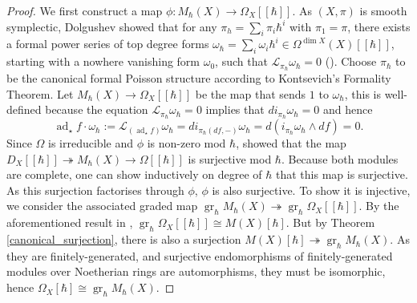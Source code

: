 \documentclass[draft]{article}
\theoremstyle{definition}
\DeclareMathOperator{\ad}{ad}
\DeclareMathOperator{\gr}{gr}
\newcommand{\doubleh}{[\![ \hbar ]\!]}
\newcommand{\MhX}{M_\hbar(X)}
\begin{document}
\begin{proof}
We first construct a map  $\phi:\MhX\to\Omega_X\doubleh$. As $(X,\pi)$ is smooth symplectic,  Dolgushev showed that for any $\pi_h=\sum_i \pi_i \hbar^i$ with $\pi_1=\pi$, there exists a
formal power series of top degree forms $\omega_\hbar= \sum_i \omega_i\hbar^i \in \Omega^{\dim X}(X)\doubleh$, starting with a nowhere vanishing form $\omega_0$, such that $\mathcal{L}_{\pi_\hbar}\omega_\hbar = 0$ (\cite[Section 3, Proposition 3.1]{The_Van_den_Bergh_duality_and_the_modular_symmetry_of_a_Poisson_variety}). Choose $\pi_\hbar$ to be the canonical formal Poisson structure according to Kontsevich's Formality Theorem. Let $\MhX\to\Omega_X\doubleh$ be the map that sends $1$ to $\omega_\hbar$, this is well-defined because the equation $\mathcal{L}_{\pi_\hbar}\omega_\hbar = 0$ implies that $di_{\pi_\hbar}\omega_\hbar=0$ and hence $$\ad_\star f\cdot \omega_\hbar:=\mathcal{L}_{(\ad_\star f)}\omega_\hbar=di_{\pi_\hbar(df,-)}\omega_\hbar=d(i_{\pi_\hbar}\omega_\hbar\wedge df)=0.$$ Since $\Omega$ is irreducible and $\phi$ is non-zero mod $\hbar$, \cite{Poisson_Traces_and_D-Modules_on_Poisson_Varieties} showed that the map $D_X\doubleh\twoheadrightarrow \MhX\to \Omega\doubleh$ is surjective mod $\hbar$. Because both modules are complete, one can show inductively on degree of $\hbar$ that this map is surjective. As this surjection factorises through $\phi$, $\phi$ is also surjective. To show it is injective, we consider the associated graded map $\gr_\hbar M_\hbar(X)\twoheadrightarrow \gr_\hbar\Omega_X\doubleh$. By the aforementioned result in \cite{Poisson_Traces_and_D-Modules_on_Poisson_Varieties}, $\gr_\hbar\Omega_X\doubleh\cong M(X)[\hbar]$. But by Theorem \ref{canonical_surjection}, there is also a surjection $ M(X)[\hbar]\twoheadrightarrow\gr_{\hbar}M_{\hbar}(X)$. As they are finitely-generated, and surjective endomorphisms of finitely-generated modules over Noetherian rings are automorphisms, they must be isomorphic, hence $\Omega_X[\hbar]\cong\gr_\hbar\MhX$. 


\end{proof}
\end{document}
